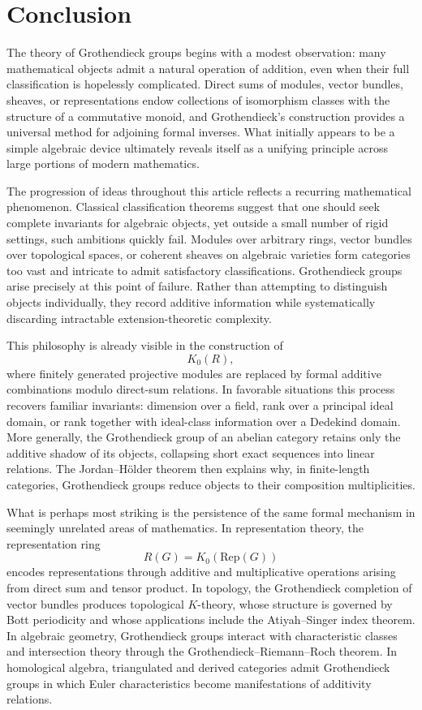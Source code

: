 \documentclass[12pt,reqno]{amsart}
\theoremstyle{plain}
\numberwithin{equation}{section}
\begin{document}
\section{Conclusion}

The theory of Grothendieck groups begins with a modest observation: many mathematical objects admit a natural operation of addition, even when their full classification is hopelessly complicated. Direct sums of modules, vector bundles, sheaves, or representations endow collections of isomorphism classes with the structure of a commutative monoid, and Grothendieck's construction provides a universal method for adjoining formal inverses. What initially appears to be a simple algebraic device ultimately reveals itself as a unifying principle across large portions of modern mathematics.

The progression of ideas throughout this article reflects a recurring mathematical phenomenon. Classical classification theorems suggest that one should seek complete invariants for algebraic objects, yet outside a small number of rigid settings, such ambitions quickly fail. Modules over arbitrary rings, vector bundles over topological spaces, or coherent sheaves on algebraic varieties form categories too vast and intricate to admit satisfactory classifications. Grothendieck groups arise precisely at this point of failure. Rather than attempting to distinguish objects individually, they record additive information while systematically discarding intractable extension-theoretic complexity.

This philosophy is already visible in the construction of
\[
K_0(R),
\]
where finitely generated projective modules are replaced by formal additive combinations modulo direct-sum relations. In favorable situations this process recovers familiar invariants: dimension over a field, rank over a principal ideal domain, or rank together with ideal-class information over a Dedekind domain. More generally, the Grothendieck group of an abelian category retains only the additive shadow of its objects, collapsing short exact sequences into linear relations. The Jordan--H\"older theorem then explains why, in finite-length categories, Grothendieck groups reduce objects to their composition multiplicities.

What is perhaps most striking is the persistence of the same formal mechanism in seemingly unrelated areas of mathematics. In representation theory, the representation ring
\[
R(G)=K_0(\mathrm{Rep}(G))
\]
encodes representations through additive and multiplicative operations arising from direct sum and tensor product. In topology, the Grothendieck completion of vector bundles produces topological $K$-theory, whose structure is governed by Bott periodicity and whose applications include the Atiyah--Singer index theorem. In algebraic geometry, Grothendieck groups interact with characteristic classes and intersection theory through the Grothendieck--Riemann--Roch theorem. In homological algebra, triangulated and derived categories admit Grothendieck groups in which Euler characteristics become manifestations of additivity relations.
\end{document}
